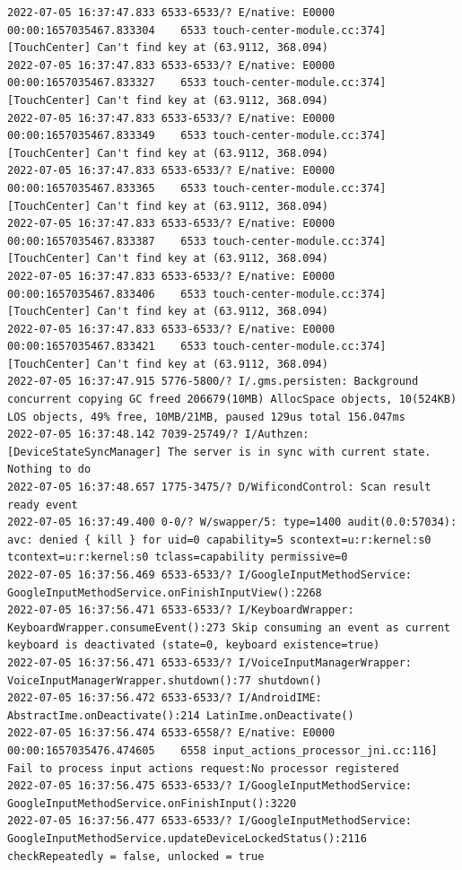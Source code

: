 \documentclass[a4paper,12pt]{book}
\begin{document}
\begin{lstlisting}
2022-07-05 16:37:47.833 6533-6533/? E/native: E0000 00:00:1657035467.833304    6533 touch-center-module.cc:374] [TouchCenter] Can't find key at (63.9112, 368.094)
2022-07-05 16:37:47.833 6533-6533/? E/native: E0000 00:00:1657035467.833327    6533 touch-center-module.cc:374] [TouchCenter] Can't find key at (63.9112, 368.094)
2022-07-05 16:37:47.833 6533-6533/? E/native: E0000 00:00:1657035467.833349    6533 touch-center-module.cc:374] [TouchCenter] Can't find key at (63.9112, 368.094)
2022-07-05 16:37:47.833 6533-6533/? E/native: E0000 00:00:1657035467.833365    6533 touch-center-module.cc:374] [TouchCenter] Can't find key at (63.9112, 368.094)
2022-07-05 16:37:47.833 6533-6533/? E/native: E0000 00:00:1657035467.833387    6533 touch-center-module.cc:374] [TouchCenter] Can't find key at (63.9112, 368.094)
2022-07-05 16:37:47.833 6533-6533/? E/native: E0000 00:00:1657035467.833406    6533 touch-center-module.cc:374] [TouchCenter] Can't find key at (63.9112, 368.094)
2022-07-05 16:37:47.833 6533-6533/? E/native: E0000 00:00:1657035467.833421    6533 touch-center-module.cc:374] [TouchCenter] Can't find key at (63.9112, 368.094)
2022-07-05 16:37:47.915 5776-5800/? I/.gms.persisten: Background concurrent copying GC freed 206679(10MB) AllocSpace objects, 10(524KB) LOS objects, 49% free, 10MB/21MB, paused 129us total 156.047ms
2022-07-05 16:37:48.142 7039-25749/? I/Authzen: [DeviceStateSyncManager] The server is in sync with current state. Nothing to do
2022-07-05 16:37:48.657 1775-3475/? D/WificondControl: Scan result ready event
2022-07-05 16:37:49.400 0-0/? W/swapper/5: type=1400 audit(0.0:57034): avc: denied { kill } for uid=0 capability=5 scontext=u:r:kernel:s0 tcontext=u:r:kernel:s0 tclass=capability permissive=0
2022-07-05 16:37:56.469 6533-6533/? I/GoogleInputMethodService: GoogleInputMethodService.onFinishInputView():2268 
2022-07-05 16:37:56.471 6533-6533/? I/KeyboardWrapper: KeyboardWrapper.consumeEvent():273 Skip consuming an event as current keyboard is deactivated (state=0, keyboard existence=true)
2022-07-05 16:37:56.471 6533-6533/? I/VoiceInputManagerWrapper: VoiceInputManagerWrapper.shutdown():77 shutdown()
2022-07-05 16:37:56.472 6533-6533/? I/AndroidIME: AbstractIme.onDeactivate():214 LatinIme.onDeactivate()
2022-07-05 16:37:56.474 6533-6558/? E/native: E0000 00:00:1657035476.474605    6558 input_actions_processor_jni.cc:116] Fail to process input actions request:No processor registered
2022-07-05 16:37:56.475 6533-6533/? I/GoogleInputMethodService: GoogleInputMethodService.onFinishInput():3220 
2022-07-05 16:37:56.477 6533-6533/? I/GoogleInputMethodService: GoogleInputMethodService.updateDeviceLockedStatus():2116 checkRepeatedly = false, unlocked = true

\end{lstlisting}
\end{document}
